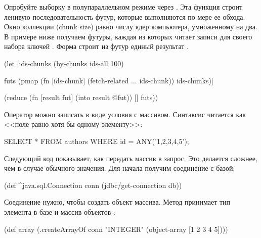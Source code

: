 Опробуйте выборку в полупараллельном режиме через . Эта функция строит ленивую последовательность футур, которые выполняются по мере ее обхода. Окно коллекции (chunk size) равно числу ядер компьютера, умноженному на два. В примере ниже получаем футуры, каждая из которых читает записи для своего набора ключей . Форма  строит из футур единый результат .

\begin{english}
  \begin{clojure/lines}
(let [ids-chunks
      (by-chunks ids-all 100)

      futs
      (pmap (fn [ids-chunk]
              (fetch-related ... ids-chunk))
            ids-chunks)]

  (reduce
   (fn [result fut]
     (into result @fut))
   []
   futs))
  \end{clojure/lines}
\end{english}

Оператор  можно записать в виде условия  с массивом. Синтаксис читается как <<поле  равно хотя бы одному элементу>>:

\begin{english}
  \begin{sql}
SELECT * FROM authors WHERE id = ANY('{1,2,3,4,5}');
  \end{sql}
\end{english}

Следующий код показывает, как передать массив в запрос. Это делается сложнее, чем в случае обычного значения. Для начала получим соединение с базой:

\begin{english}
  \begin{clojure}
(def ^java.sql.Connection conn
  (jdbc/get-connection db))
  \end{clojure}
\end{english}

Соединение нужно, чтобы создать объект массива. Метод  принимает тип элемента в базе и массив объектов :

\begin{english}
  \begin{clojure}
(def array
  (.createArrayOf conn "INTEGER"
                  (object-array [1 2 3 4 5])))
  \end{clojure}
\end{english}


